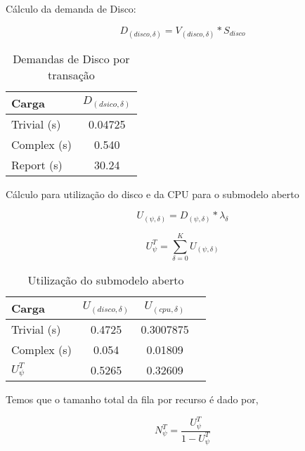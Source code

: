 \documentclass[11pt,a4paper]{abntex2}
\begin{document}
Cálculo da demanda de Disco:

\begin{equation}
D_{(disco,\delta)} =V_{(disco,\delta)} * S_{disco}
\end{equation}

\begin{table}[htbp]
	\centering
	\caption{Demandas de Disco por transação} 
	\begin{tabular}{lc}
		\toprule
		Carga      & $D_{(dsico,\delta)}$\\
		\midrule
		Trivial (s)& 0.04725 \\[3pt]
		Complex (s)& 0.540 \\[3pt]
		Report (s) & 30.24 \\[3pt]
		\bottomrule
	\end{tabular}%
	\label{tab:addlabel}%
\end{table}%


Cálculo para utilização do disco e da CPU para o submodelo aberto

\begin{equation}
U_{(\psi,\delta)} =D_{(\psi,\delta)} * \lambda_{\delta}
\end{equation}

\begin{equation}
U^{T}_{\psi} = \sum_{\delta=0}^{K} U_{(\psi,\delta)}
\end{equation}


\begin{table}[htbp]
	\centering
	\caption{Utilização do submodelo aberto} 
	\begin{tabular}{lccc}
		\toprule
		Carga      & $U_{(disco,\delta)}$& $U_{(cpu,\delta)}$ \\
		\midrule
		Trivial (s)            & 0.4725 & 0.3007875\\[3pt]
		Complex (s)            & 0.054  & 0.01809\\[3pt]
		$U^{T}_{\psi}$ & 0.5265 & 0.32609 \\[3pt]
		\bottomrule
	\end{tabular}%
	\label{tab:addlabel}%
\end{table}%

Temos que o tamanho total da fila por recurso é dado por,

\begin{equation}
N^{T}_{\psi} = \frac{U^{T}_{\psi}}{1 - U^{T}_{\psi}}
\end{equation}
\end{document}
